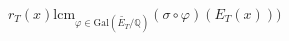 \documentclass[preview]{standalone}
\begin{document}
\begin{center}
$r_T(x)\text{lcm}_{\varphi \in \text{Gal}\left(\widetilde{E_T}/\mathbb{Q}\right)} (\sigma \circ \varphi)(E_T(x)))$
\end{center}
\end{document}

